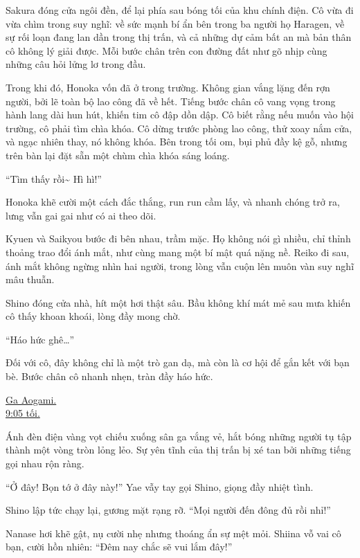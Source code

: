 \documentclass[../main.tex]{subfiles}
\begin{document}
Sakura đóng cửa ngôi đền, để lại phía sau bóng tối của khu chính điện. Cô vừa đi vừa chìm trong suy nghĩ: về sức mạnh bí ẩn bên trong ba người họ Haragen, về sự rối loạn đang lan dần trong thị trấn, và cả những dự cảm bất an mà bản thân cô không lý giải được. Mỗi bước chân trên con đường đất như gõ nhịp cùng những câu hỏi lửng lơ trong đầu.

Trong khi đó, Honoka vốn đã ở trong trường. Không gian vắng lặng đến rợn người, bởi lẽ toàn bộ lao công đã về hết. Tiếng bước chân cô vang vọng trong hành lang dài hun hút, khiến tim cô đập dồn dập. Cô biết rằng nếu muốn vào hội trường, cô phải tìm chìa khóa. Cô dừng trước phòng lao công, thử xoay nắm cửa, và ngạc nhiên thay, nó không khóa. Bên trong tối om, bụi phủ đầy kệ gỗ, nhưng trên bàn lại đặt sẵn một chùm chìa khóa sáng loáng.

``Tìm thấy rồi\~{} Hì hì!''

Honoka khẽ cười một cách đắc thắng, run run cầm lấy, và nhanh chóng trở ra, lưng vẫn gai gai như có ai theo dõi.

Kyuen và Saikyou bước đi bên nhau, trầm mặc. Họ không nói gì nhiều, chỉ thỉnh thoảng trao đổi ánh mắt, như cùng mang một bí mật quá nặng nề. Reiko đi sau, ánh mắt không ngừng nhìn hai người, trong lòng vẫn cuộn lên muôn vàn suy nghĩ mâu thuẫn.

Shino đóng cửa nhà, hít một hơi thật sâu. Bầu không khí mát mẻ sau mưa khiến cô thấy khoan khoái, lòng đầy mong chờ.

``Háo hức ghê\dots''


Đối với cô, đây không chỉ là một trò gan dạ, mà còn là cơ hội để gắn kết với bạn bè. Bước chân cô nhanh nhẹn, tràn đầy háo hức.

\begin{center}
  \uline{Ga Aogami.\\9:05 tối.}
\end{center}

Ánh đèn điện vàng vọt chiếu xuống sân ga vắng vẻ, hắt bóng những người tụ tập thành một vòng tròn lỏng lẻo. Sự yên tĩnh của thị trấn bị xé tan bởi những tiếng gọi nhau rộn ràng.

``Ở đây! Bọn tớ ở đây này!'' Yae vẫy tay gọi Shino, giọng đầy nhiệt tình.

Shino lập tức chạy lại, gương mặt rạng rỡ. ``Mọi người đến đông đủ rồi nhỉ!''

Nanase hơi khẽ gật, nụ cười nhẹ nhưng thoáng ẩn sự mệt mỏi. Shiina vỗ vai cô bạn, cười hồn nhiên: ``Đêm nay chắc sẽ vui lắm đây!''
\end{document}
